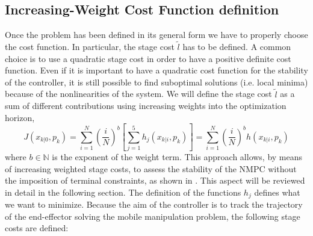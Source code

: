 \subsection{Increasing-Weight Cost Function definition}

Once the problem has been defined in its general form we have to properly choose the cost function. In particular, the stage cost $\tilde{l}$ has to be defined. A common choice is to use a quadratic stage cost in order to have a positive definite cost function. Even if it is important to have a quadratic cost function for the stability of the controller, it is still possible to find suboptimal solutions (i.e. local minima) because of the nonlinearities of the system. We will define the stage cost $\tilde{l}$ as a sum of different contributions using increasing weights into the optimization horizon, 
\begin{equation}\label{costfunctionh}
J({x}_{k|0},p_k)=\sum_{i=1}^{N}\left(\frac{i}{N}\right)^b \left[ \sum_{j=1}^{5} h_j({x}_{k|i},p_k) \right]=\sum_{i=1}^{N}\left(\frac{i}{N}\right)^b h({x}_{k|i},p_k)
\end{equation} 
where $b \in \mathbb{N}$ is the exponent of the weight term. This approach allows, by means of increasing weighted stage costs, to assess the stability of the NMPC without the imposition of terminal constraints, as shown in \cite{alamir2018stability}. This aspect will be reviewed in detail in the following section.
The definition of the functions $h_j$ defines what we want to minimize. Because the aim of the controller is to track the trajectory of the end-effector solving the mobile manipulation problem, the following stage costs are defined:
